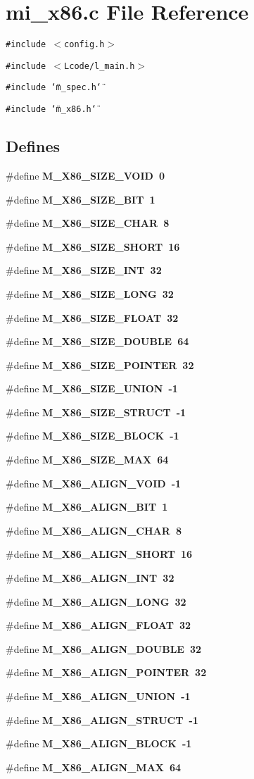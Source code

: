 \section{mi\_\-x86.c File Reference}
\label{mi__x86_8c}
{\tt \#include $<$config.h$>$}\par
{\tt \#include $<$Lcode/l\_\-main.h$>$}\par
{\tt \#include \char`\"{}m\_\-spec.h\char`\"{}}\par
{\tt \#include \char`\"{}m\_\-x86.h\char`\"{}}\par
\subsection*{Defines}
\begin{CompactItemize}
\item 
\#define \bf{M\_\-X86\_\-SIZE\_\-VOID}~0
\item 
\#define \bf{M\_\-X86\_\-SIZE\_\-BIT}~1
\item 
\#define \bf{M\_\-X86\_\-SIZE\_\-CHAR}~8
\item 
\#define \bf{M\_\-X86\_\-SIZE\_\-SHORT}~16
\item 
\#define \bf{M\_\-X86\_\-SIZE\_\-INT}~32
\item 
\#define \bf{M\_\-X86\_\-SIZE\_\-LONG}~32
\item 
\#define \bf{M\_\-X86\_\-SIZE\_\-FLOAT}~32
\item 
\#define \bf{M\_\-X86\_\-SIZE\_\-DOUBLE}~64
\item 
\#define \bf{M\_\-X86\_\-SIZE\_\-POINTER}~32
\item 
\#define \bf{M\_\-X86\_\-SIZE\_\-UNION}~-1
\item 
\#define \bf{M\_\-X86\_\-SIZE\_\-STRUCT}~-1
\item 
\#define \bf{M\_\-X86\_\-SIZE\_\-BLOCK}~-1
\item 
\#define \bf{M\_\-X86\_\-SIZE\_\-MAX}~64
\item 
\#define \bf{M\_\-X86\_\-ALIGN\_\-VOID}~-1
\item 
\#define \bf{M\_\-X86\_\-ALIGN\_\-BIT}~1
\item 
\#define \bf{M\_\-X86\_\-ALIGN\_\-CHAR}~8
\item 
\#define \bf{M\_\-X86\_\-ALIGN\_\-SHORT}~16
\item 
\#define \bf{M\_\-X86\_\-ALIGN\_\-INT}~32
\item 
\#define \bf{M\_\-X86\_\-ALIGN\_\-LONG}~32
\item 
\#define \bf{M\_\-X86\_\-ALIGN\_\-FLOAT}~32
\item 
\#define \bf{M\_\-X86\_\-ALIGN\_\-DOUBLE}~32
\item 
\#define \bf{M\_\-X86\_\-ALIGN\_\-POINTER}~32
\item 
\#define \bf{M\_\-X86\_\-ALIGN\_\-UNION}~-1
\item 
\#define \bf{M\_\-X86\_\-ALIGN\_\-STRUCT}~-1
\item 
\#define \bf{M\_\-X86\_\-ALIGN\_\-BLOCK}~-1
\item 
\#define \bf{M\_\-X86\_\-ALIGN\_\-MAX}~64
\end{CompactItemize}
